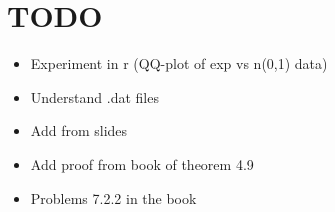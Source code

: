 \section{TODO}\par
\begin{itemize}
  \item Experiment in r (QQ-plot of exp vs n(0,1) data)
  \item Understand .dat files
  \item Add from slides
  \item Add proof from book of theorem 4.9 
  \item Problems 7.2.2 in the book
\end{itemize}
